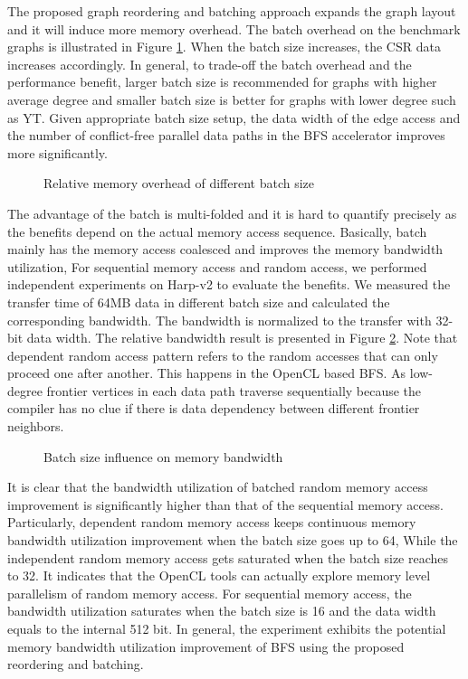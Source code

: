 The proposed graph reordering and batching approach expands the 
graph layout and it will induce more memory overhead. The batch overhead 
on the benchmark graphs is illustrated in Figure \ref{fig:batch-overhead}. 
When the batch size increases, the CSR data increases accordingly. 
In general, to trade-off the batch overhead and the performance benefit, 
larger batch size is recommended for graphs with higher average degree 
and smaller batch size is better for graphs with lower degree 
such as YT. Given appropriate batch size setup, the data width 
of the edge access and the number of conflict-free parallel data paths 
in the BFS accelerator improves more significantly. 

\begin{figure}
    \caption{Relative memory overhead of different batch size}
\label{fig:batch-overhead}
\vspace{-1em}
\end{figure}


The advantage of the batch is multi-folded and it is hard to 
quantify precisely as the benefits depend on the actual 
memory access sequence. Basically, batch mainly has the memory 
access coalesced and improves the memory bandwidth utilization, 
For sequential memory access and random access, 
we performed independent experiments on Harp-v2 
to evaluate the benefits. We measured the transfer time 
of 64MB data in different batch size and calculated the 
corresponding bandwidth. The bandwidth is normalized to 
the transfer with 32-bit data width. The relative bandwidth result is presented in 
Figure \ref{fig:mem-bandwidth}. Note that dependent random access pattern 
refers to the random accesses that can only proceed one after another.
This happens in the OpenCL based BFS. As low-degree frontier 
vertices in each data path traverse sequentially because the compiler 
has no clue if there is data dependency between different frontier 
neighbors. 

\begin{figure}
    \caption{Batch size influence on memory bandwidth}
\label{fig:mem-bandwidth}
\vspace{-1em}
\end{figure}


It is clear that the bandwidth utilization of batched random memory access
improvement is significantly higher than that of the sequential memory access. 
Particularly, dependent random memory access keeps continuous memory 
bandwidth utilization improvement when the batch size goes up to 64,
While the independent random memory access gets saturated when 
the batch size reaches to 32. It indicates that the OpenCL tools 
can actually explore memory level parallelism of random memory access.
For sequential memory access, the bandwidth utilization saturates 
when the batch size is 16 and the data width equals to the 
internal 512 bit. In general, the experiment exhibits the potential 
memory bandwidth utilization improvement of BFS using the proposed 
reordering and batching.

